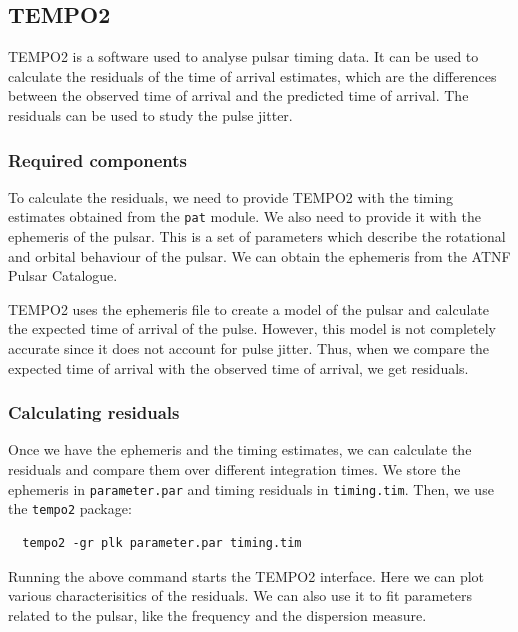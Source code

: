 \documentclass{article_saj}
\begin{document}
\pagebreak
\subsection{TEMPO2}
TEMPO2 \cite{Edwards_2006} is a software used to analyse pulsar timing data. It can be used to calculate the residuals of the time of arrival estimates, which are the differences between the observed time of arrival and the predicted time of arrival. The residuals can be used to study the pulse jitter.

\subsubsection{Required components}
To calculate the residuals, we need to provide TEMPO2 with the timing estimates obtained from the \texttt{pat} module. We also need to provide it with the ephemeris of the pulsar. This is a set of parameters which describe the rotational and orbital behaviour of the pulsar. We can obtain the ephemeris from the ATNF Pulsar Catalogue. 

TEMPO2 uses the ephemeris file to create a model of the pulsar and calculate the expected time of arrival of the pulse. However, this model is not completely accurate since it does not account for pulse jitter. Thus, when we compare the expected time of arrival with the observed time of arrival, we get residuals. 

\subsubsection{Calculating residuals}
Once we have the ephemeris and the timing estimates, we can calculate the residuals and compare them over different integration times. We store the ephemeris in \texttt{parameter.par} and timing residuals in \texttt{timing.tim}. Then, we use the \texttt{tempo2} package:
\begin{verbatim}
  tempo2 -gr plk parameter.par timing.tim
\end{verbatim}

Running the above command starts the TEMPO2 interface. Here we can plot various characterisitics of the residuals. We can also use it to fit parameters related to the pulsar, like the frequency and the dispersion measure. 
\end{document}
